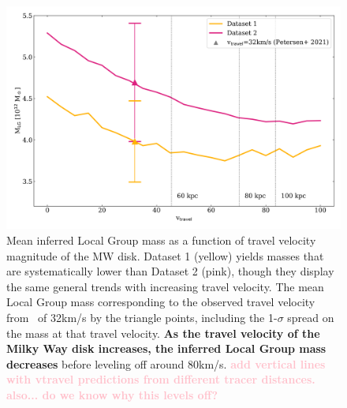\documentclass[twocolumn]{aastex631}
\newcommand{\kc}[1]{\textcolor{pink}{\textbf{#1}} }
\begin{document}
\begin{figure}[htb]
    \centering
    \includegraphics[width=\columnwidth]{analyze-runs-MvV.png}
    \caption{\label{fig:mvsv} Mean inferred Local Group mass as a function of travel velocity magnitude of the MW disk. Dataset 1 (yellow) yields masses that are systematically lower than Dataset 2 (pink), though they display the same general trends with increasing travel velocity. 
    The mean Local Group mass corresponding to the observed travel velocity from~\cite{Petersen2021} of 32km/s by the triangle points, including the 1-$\sigma$ spread on the mass at that travel velocity. \textbf{As the travel velocity of the Milky Way disk increases, the inferred Local Group mass decreases} before leveling off around 80km/s. 
     \kc{add vertical lines with vtravel predictions from different tracer distances. also... do we know why this levels off?}
    }
  \end{figure}
\end{document}
